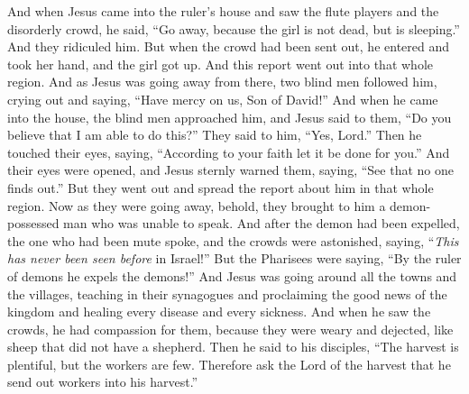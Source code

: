 \begin{biblechapter}
\verse And when Jesus came into the ruler’s house and saw the flute players and the disorderly crowd,
\verse he said, “Go away, because the girl is not dead, but is sleeping.” And they ridiculed him.
\verse But when the crowd had been sent out, he entered and took her hand, and the girl got up.
\verse And this report went out into that whole region.
 And as Jesus was going away from there, two blind men followed him, crying out and saying, “Have mercy on us, Son of David!”
\verse And when he came into the house, the blind men approached him, and Jesus said to them, “Do you believe that I am able to do this?” They said to him, “Yes, Lord.”
\verse Then he touched their eyes, saying, “According to your faith let it be done for you.”
\verse And their eyes were opened, and Jesus sternly warned them, saying, “See that no one finds out.”
\verse But they went out and spread the report about him in that whole region.
 Now as they were going away, behold, they brought to him a demon-possessed man who was unable to speak.
\verse And after the demon had been expelled, the one who had been mute spoke, and the crowds were astonished, saying, “\textit{This has never been seen before} in Israel!”
\verse But the Pharisees were saying, “By the ruler of demons he expels the demons!”
 And Jesus was going around all the towns and the villages, teaching in their synagogues and proclaiming the good news of the kingdom and healing every disease and every sickness.
\verse And when he saw the crowds, he had compassion for them, because they were weary and dejected, like sheep that did not have a shepherd.
\verse Then he said to his disciples, “The harvest is plentiful, but the workers are few.
\verse Therefore ask the Lord of the harvest that he send out workers into his harvest.”
\end{biblechapter}

